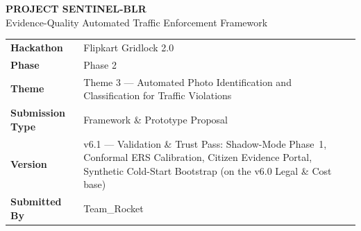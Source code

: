 \documentclass[11pt,a4paper]{article}
\begin{document}
\vspace{1em}
\begin{center}
    {\Huge\bfseries\color{sentinelblue} PROJECT SENTINEL-BLR}\\[0.5em]
    {\large\color{gray} Evidence-Quality Automated Traffic Enforcement Framework}\\[1.2em]
\vspace{2em}
    \begin{tabular}{L{3.5cm} L{11cm}}
        \toprule
        \\
        \midrule
        \textbf{Hackathon}       & Flipkart Gridlock 2.0 \\
        \textbf{Phase}           & Phase 2 \\
        \textbf{Theme}           & Theme 3 — Automated Photo Identification and Classification for Traffic Violations \\
        \textbf{Submission Type} & Framework \& Prototype Proposal \\
        \textbf{Version}         & v6.1 --- Validation \& Trust Pass: Shadow-Mode Phase~1, Conformal ERS Calibration, Citizen Evidence Portal, Synthetic Cold-Start Bootstrap (on the v6.0 Legal \& Cost base) \\
        \textbf{Submitted By}    & Team\_Rocket \\
        \bottomrule
    \end{tabular}
\end{center}

\vspace{0.8em}
\end{document}
